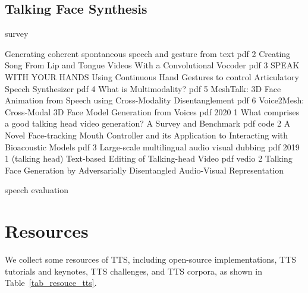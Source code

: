 \documentclass{article}
\begin{document}
\subsection{Talking Face Synthesis}
survey ~\cite{chen2020comprises}

	Generating coherent spontaneous speech and gesture from text	pdf
2	Creating Song From Lip and Tongue Videos With a Convolutional Vocoder	pdf
3	SPEAK WITH YOUR HANDS Using Continuous Hand Gestures to control Articulatory Speech Synthesizer	pdf
4	What is Multimodality?	pdf
5	MeshTalk: 3D Face Animation from Speech using Cross-Modality Disentanglement	pdf
6	Voice2Mesh: Cross-Modal 3D Face Model Generation from Voices	pdf
2020
1	What comprises a good talking head video generation? A Survey and Benchmark	pdf   code
2	A Novel Face-tracking Mouth Controller and its Application to Interacting with Bioacoustic Models	pdf
3	Large-scale multilingual audio visual dubbing	pdf
2019
1	(talking head) Text-based Editing of Talking-head Video	pdf   vedio
2	Talking Face Generation by Adversarially Disentangled Audio-Visual Representation


\cite{lo2019mosnet,choi2020deep,mittag2020deep,leng2021mbnet} speech evaluation
\fi


\section{Resources}
\label{sec_resource}
We collect some resources of TTS, including open-source implementations, TTS tutorials and keynotes, TTS challenges, and TTS corpora, as shown in Table~\ref{tab_resouce_tts}.
\end{document}
